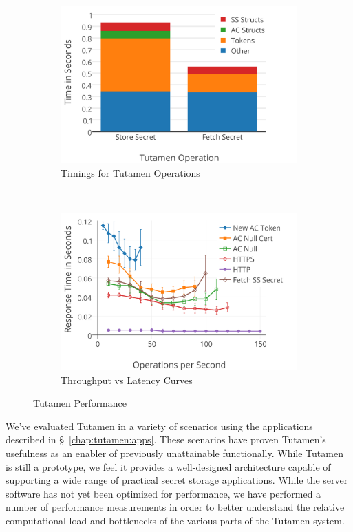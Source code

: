 \begin{figure}[!t]
  \centering
  \begin{subfigure}[t]{0.48\textwidth}
    \includegraphics[width=\columnwidth]{./figs/pre/Tutamen-Chart-Timings.png}
    \caption{Timings for Tutamen Operations}
    \label{fig:tutamen:charts:timings}
  \end{subfigure}
  ~
  \begin{subfigure}[t]{0.48\textwidth}
    \includegraphics[width=\columnwidth]{./figs/pre/Tutamen-Chart-IOPS.png}
    \caption{Throughput vs Latency Curves}
    \label{fig:tutamen:charts:iops}
  \end{subfigure}
  \caption{Tutamen Performance}
  \label{fig:tutamen:charts}
\end{figure}

We've evaluated Tutamen in a variety of scenarios using the
applications described in \S~\ref{chap:tutamen:apps}. These scenarios have
proven Tutamen's usefulness as an enabler of previously unattainable
functionally. While Tutamen is still a prototype, we feel it provides
a well-designed architecture capable of supporting a wide range of
practical secret storage applications. While the server software has
not yet been optimized for performance, we have performed a number of
performance measurements in order to better understand the relative
computational load and bottlenecks of the various parts of the Tutamen
system.

